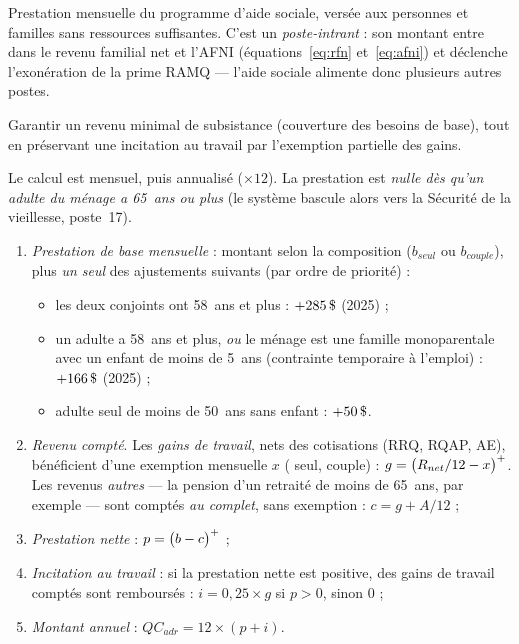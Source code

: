
\pdesc Prestation mensuelle du programme d'aide sociale, versée aux
personnes et familles sans ressources suffisantes. C'est un
\emph{poste-intrant} : son montant entre dans le revenu familial net et
l'AFNI (équations~\ref{eq:rfn} et~\ref{eq:afni}) et déclenche l'exonération
de la prime RAMQ --- l'aide sociale alimente donc plusieurs autres postes.

\pobj Garantir un revenu minimal de subsistance (couverture des besoins de
base), tout en préservant une incitation au travail par l'exemption
partielle des gains.

\pregle Le calcul est mensuel, puis annualisé ($\times 12$). La prestation
est \emph{nulle dès qu'un adulte du ménage a 65~ans ou plus} (le système
bascule alors vers la Sécurité de la vieillesse, poste~17).

\begin{enumerate}
  \item \emph{Prestation de base mensuelle} : montant selon la composition
        ($b_{seul}$ ou $b_{couple}$), plus \emph{un seul} des ajustements
        suivants (par ordre de priorité) :
        \begin{itemize}
          \item les deux conjoints ont 58~ans et plus : $+\D{285}$ (2025) ;
          \item un adulte a 58~ans et plus, \emph{ou} le ménage est une
                famille monoparentale avec un enfant de moins de 5~ans
                (contrainte temporaire à l'emploi) : $+\D{166}$ (2025) ;
          \item adulte seul de moins de 50~ans sans enfant : $+\D{50}$.
        \end{itemize}
  \item \emph{Revenu compté}. Les \emph{gains de travail}, nets des
        cotisations (RRQ, RQAP, AE), bénéficient d'une exemption mensuelle
        $x$ ( seul,  couple) :
        $g = \bigl(R_{net}/12 - x\bigr)^{+}$. Les revenus \emph{autres} --- la
        pension d'un retraité de moins de 65~ans, par exemple --- sont
        comptés \emph{au complet}, sans exemption : $c = g + A/12$ ;
  \item \emph{Prestation nette} : $p = \bigl(b - c\bigr)^{+}$ ;
  \item \emph{Incitation au travail} : si la prestation nette est positive,
         des gains de travail comptés sont remboursés :
        $i = 0{,}25 \times g$ si $p > 0$, sinon $0$ ;
  \item \emph{Montant annuel} : $QC_{adr} = 12 \times (p + i)$.
\end{enumerate}

